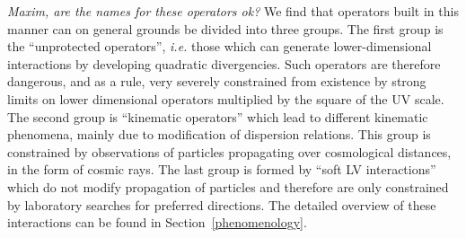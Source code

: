 \documentclass[12pt,preprintnumbers,nofootinbib]{revtex4}
\begin{document}
	{\it Maxim, are the names for these operators ok?}
	We find that operators built in this manner can on general grounds be 
	divided into three groups.
	The first group is the ``unprotected operators'', {\it i.e.} those which can
	generate lower-dimensional interactions by developing quadratic divergencies.
	Such operators are therefore dangerous, and as a rule, very severely constrained
	from existence by strong limits on lower dimensional operators multiplied
	by the square of the UV scale.
	The second group is ``kinematic operators'' which lead to different kinematic
	phenomena, mainly due to modification of dispersion relations.
	This group is constrained by observations of particles propagating over cosmological 
	distances, in the form of cosmic rays.
	The last group is formed by ``soft LV interactions'' which do not modify
	propagation of particles and therefore are only constrained by laboratory
	searches for preferred directions.
	The detailed overview of these interactions can be found 
	in Section~\ref{phenomenology}.


\end{document}
